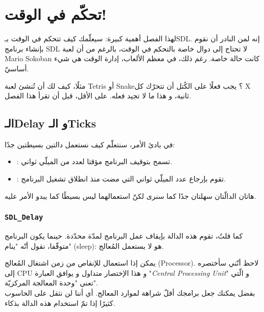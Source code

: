 \chapter{تحكّم في الوقت!}

لهذا الفصل أهمية كبيرة: سيعلّمك كيف تتحكم في الوقت بـ\textenglish{SDL}.
 إنه لمن النادر أن نقوم بإنشاء برنامج
\textenglish{SDL}
لا تحتاج إلى دوال خاصة بالتحكم في الوقت، بالرغم من أن لعبة
\textenglish{Mario Sokoban}
كانت حالة خاصة. رغم ذلك، في معظم الألعاب، إدارة الوقت هي شيء أساسيّ.

مثلًا، كيف لك أن تُنشئ لعبة 
\textenglish{Tetris}
أو
\textenglish{Snake}؟
يجب فعلًا على الكُتل أن تتحرّك كل
\textenglish{X}
ثانية، و هذا ما لا تجيد فعله. على الأقل، قبل أن تقرأ هذا الفصل.

\section{الـ\textenglish{Delay} و الـ\textenglish{Ticks}}

في بادئ الأمر، سنتعلّم كيف نستعمل دالتين بسيطتين جدًا:

\begin{itemize}
	\item {}:
	تسمح بتوقيف البرنامج مؤقتا لعدد من الميلّي ثواني.
	\item {}:
	تقوم بإرجاع عدد الميلّي ثواني التي مضت منذ انطلاق تشغيل البرنامج.
\end{itemize}

هاتان الدالّتان سهلتان جدًا كما سنرى لكنّ استعمالهما ليس بسيطًا كما يبدو الأمر عليه.

\subsection{\texttt{SDL\_Delay}}

كما قلتُ، تقوم هذه الدالة بإيقاف عمل البرنامج لمدّة محدّدة. حينما يكون البرنامج متوقّفا، نقول أنّه "ينام" 
(\textenglish{sleep}):
 هو لا يستعمل المُعالج. 
 
 يمكن إذا استعمال 
للإنقاص من زمن اشتغال المُعالج 
(\textenglish{Processor}).
لاحظ أنّني سأختصره إلى 
\textenglish{CPU}
و هذا الإختصار متداول و يوافق العبارة 
"\textit{\textenglish{Central Processing Unit}}"
و الّتي تعني "وحدة المعالجة المركزيّة".\\
بفضل 
يمكنك جعل برامجك أقلّ شراهة لموارد المعالج. أي أننا لن نثقل على الحاسوب كثيرًا إذا تمّ استخدام هذه الدالة بذكاء.

